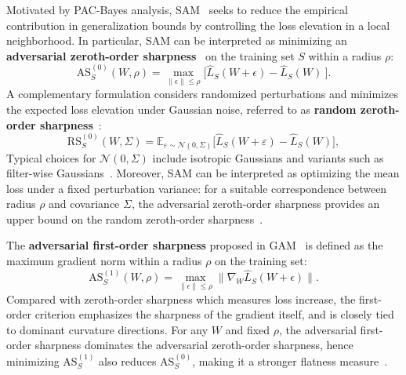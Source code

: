 \documentclass[10pt]{article} %
\begin{document}
Motivated by PAC-Bayes analysis, SAM~\citep{foretSharpnessAwareMinimizationEfficiently2021} seeks to reduce the empirical contribution in generalization bounds by controlling the loss elevation in a local neighborhood. In particular, SAM can be interpreted as minimizing an \textbf{adversarial zeroth-order sharpness}~\citep{AWP2020,foretSharpnessAwareMinimizationEfficiently2021} on the training set $S$ within a radius $\rho$:
{%
\[\mathrm{AS}^{(0)}_S(W,\rho) =\max_{ \| \epsilon \|\leq \rho } \Big[ \hat{L}_{S}(W+{\epsilon})-\hat{L}_{S}(W)\ \Big].\]
}
A complementary formulation considers randomized perturbations and minimizes the expected loss elevation under Gaussian noise, referred to as \textbf{random zeroth-order sharpness}~\citep{liRevisitingRandomWeight2024,jiang2019fantasticgeneralizationmeasures}:
{%
\[
\mathrm{RS}_S^{(0)}({W}, \Sigma)
 =
 \mathbb{E}_{\varepsilon \sim \mathcal{N}(0,\Sigma)}
 \big[
 \hat{L}_{S}({W}+\varepsilon) - \hat{L}_{S}({W})
 \big],
 \]}Typical choices for $\mathcal{N}(0,\Sigma)$ include isotropic Gaussians and variants such as filter-wise Gaussians~\citep{pmlr-v151-bisla22a}. Moreover, SAM can be interpreted as optimizing the mean loss under a fixed perturbation variance: for a suitable correspondence between radius $\rho$ and covariance $\Sigma$, 
 the adversarial zeroth-order sharpness provides an upper bound on the random zeroth-order sharpness~\cite{mollenhoffSAMOptimalRelaxation2022}.

The \textbf{adversarial first-order sharpness} proposed in GAM~\citep{Zhang_GAM} is defined as the maximum gradient norm within a radius $\rho$ on the training set:
{%
\[\mathrm{AS}^{(1)}_S(W,\rho) = \max_{ \| \epsilon \|\leq \rho } \| \nabla_{W} \hat{L}_S(W+\epsilon)\|.\]}Compared with zeroth-order sharpness which measures  loss increase, the first-order criterion emphasizes the sharpness of the gradient itself, and is closely tied to dominant curvature directions. For any $W$ and fixed $\rho$, the adversarial first-order sharpness dominates the adversarial zeroth-order sharpness, hence minimizing $\mathrm{AS}^{(1)}_S$ also reduces $\mathrm{AS}^{(0)}_S$, making it a stronger flatness measure~\citep{Zhang_GAM}.
\end{document}

